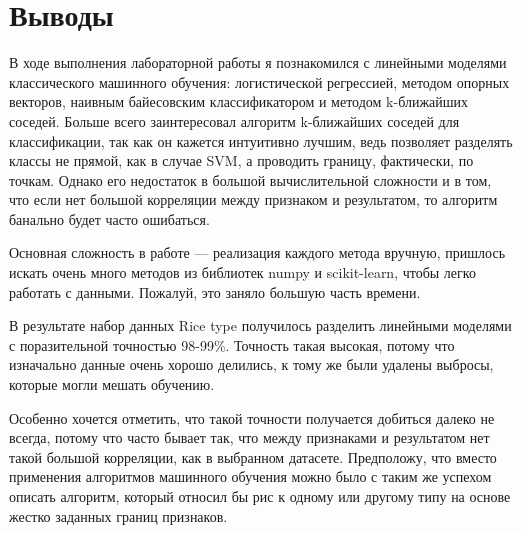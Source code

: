 \section{Выводы}
В ходе выполнения лабораторной работы я познакомился с линейными моделями классического машинного обучения: логистической регрессией, 
методом опорных векторов, наивным байесовским классификатором и методом k-ближайших соседей. Больше всего заинтересовал алгоритм 
k-ближайших соседей для классификации, так как он кажется интуитивно лучшим, ведь позволяет разделять классы не прямой, как в случае SVM,
а проводить границу, фактически, по точкам. Однако его недостаток в большой вычислительной сложности и в том, что если нет большой корреляции 
между признаком и результатом, то алгоритм банально будет часто ошибаться.

Основная сложность в работе --- реализация каждого метода вручную, пришлось искать очень много методов из библиотек numpy и scikit-learn, 
чтобы легко работать с данными. Пожалуй, это заняло большую часть времени.

В результате набор данных Rice type получилось разделить линейными моделями с поразительной точностью 98-99\%. Точность такая высокая, 
потому что изначально данные очень хорошо делились, к тому же были удалены выбросы, которые могли мешать обучению.

Особенно хочется отметить, что такой точности получается добиться далеко не всегда, потому что часто бывает так, что между
признаками и результатом нет такой большой корреляции, как в выбранном датасете. Предположу, что вместо применения алгоритмов машинного обучения
можно было с таким же успехом описать алгоритм, который относил бы рис к одному или другому типу на основе жестко заданных границ признаков.
\pagebreak
